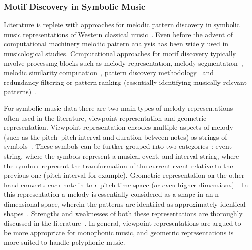 \subsubsection{Motif Discovery in Symbolic Music}
\label{sec:motif_in_symbolic_music}

Literature is replete with approaches for melodic pattern discovery in symbolic music representations of Western classical music~\citep{cambouropoulos1997towards,meredith2006point,conklin2001representation,Lartillot2005b}. Even before the advent of computational machinery melodic pattern analysis has been widely used in musicological studies. Computational approaches for motif discovery typically involve processing blocks such as melody representation\citep{meredith2006point}, melody segmentation~\citep{Cambouropoulos2006}, melodic similarity computation~\citep{Cambouropoulos2001,Marsden2012}, pattern discovery methodology~\citep{collins2013siarct,meredith2002algorithms} and redundancy filtering or pattern ranking (essentially identifying musically relevant patterns)~\citep{Lartillot2005,conklin2010discovery}. 

For symbolic music data there are two main types of melody representations often used in the literature, viewpoint representation and geometric representation. Viewpoint representation encodes multiple aspects of melody (such as the pitch, pitch interval and duration between notes) as strings of symbols~\citep{conklin2001representation,conklin1995multiple}. These symbols can be further grouped into two categories~\citep{meredith2002algorithms}: event string, where the symbols represent a musical event, and interval string, where the symbols represent the transformation of the current event relative to the previous one (pitch interval for example). Geometric representation on the other hand converts each note in to a pitch-time space (or even higher-dimensions)~\citep{meredith2002algorithms}. In this representation a melody is essentially considered as a shape in an n-dimensional space, wherein the patterns are identified as approximately identical shapes~\citep{meredith2002algorithms}. Strengths and weaknesses of both these representations are thoroughly discussed in the literature~\citep{Cambouropoulos2009,meredith2002algorithms}. In general, viewpoint representations are argued to be more appropriate for monophonic music, and geometric representations is more suited to handle polyphonic music. 

